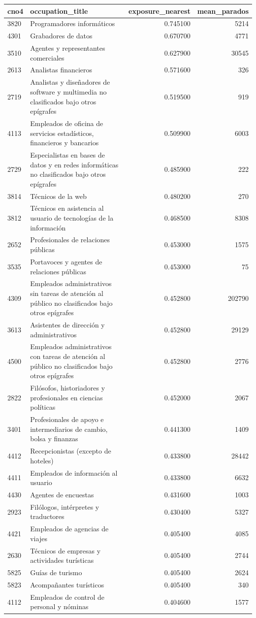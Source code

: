 \begin{tabular}{llrr}
\toprule
cno4 & occupation\_title & exposure\_nearest & mean\_parados \\
\midrule
3820 & Programadores informáticos & 0.745100 & 5214 \\
4301 & Grabadores de datos & 0.670700 & 4771 \\
3510 & Agentes y representantes comerciales & 0.627900 & 30545 \\
2613 & Analistas financieros & 0.571600 & 326 \\
2719 & Analistas y diseñadores de software y multimedia no clasificados bajo otros epígrafes & 0.519500 & 919 \\
4113 & Empleados de oficina de servicios estadísticos, financieros y bancarios & 0.509900 & 6003 \\
2729 & Especialistas en bases de datos y en redes informáticas no clasificados bajo otros epígrafes & 0.485900 & 222 \\
3814 & Técnicos de la web & 0.480200 & 270 \\
3812 & Técnicos en asistencia al usuario de tecnologías de la información & 0.468500 & 8308 \\
2652 & Profesionales de relaciones públicas & 0.453000 & 1575 \\
3535 & Portavoces y agentes de relaciones públicas & 0.453000 & 75 \\
4309 & Empleados administrativos sin tareas de atención al público no clasificados bajo otros epígrafes & 0.452800 & 202790 \\
3613 & Asistentes de dirección y administrativos & 0.452800 & 29129 \\
4500 & Empleados administrativos con tareas de atención al público no clasificados bajo otros epígrafes & 0.452800 & 2776 \\
2822 & Filósofos, historiadores y profesionales en ciencias políticas & 0.452000 & 2067 \\
3401 & Profesionales de apoyo e intermediarios de cambio, bolsa y finanzas & 0.441300 & 1409 \\
4412 & Recepcionistas (excepto de hoteles) & 0.433800 & 28442 \\
4411 & Empleados de información al usuario & 0.433800 & 6632 \\
4430 & Agentes de encuestas & 0.431600 & 1003 \\
2923 & Filólogos, intérpretes y traductores & 0.430400 & 5327 \\
4421 & Empleados de agencias de viajes & 0.405400 & 4085 \\
2630 & Técnicos de empresas y actividades turísticas & 0.405400 & 2744 \\
5825 & Guías de turismo & 0.405400 & 2624 \\
5823 & Acompañantes turísticos & 0.405400 & 340 \\
4112 & Empleados de control de personal y nóminas & 0.404600 & 1577 \\
\bottomrule
\end{tabular}
